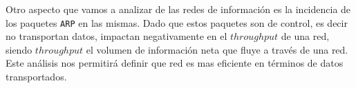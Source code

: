Otro aspecto que vamos a analizar de las redes de información es la incidencia de los paquetes \texttt{ARP} en las mismas. Dado que estos paquetes son de control, es decir no transportan datos, impactan negativamente en el $throughput$ de una red, siendo $throughput$ el volumen de información neta que fluye a través de una red. Este análisis nos permitirá definir que red es mas eficiente en términos de datos transportados.
